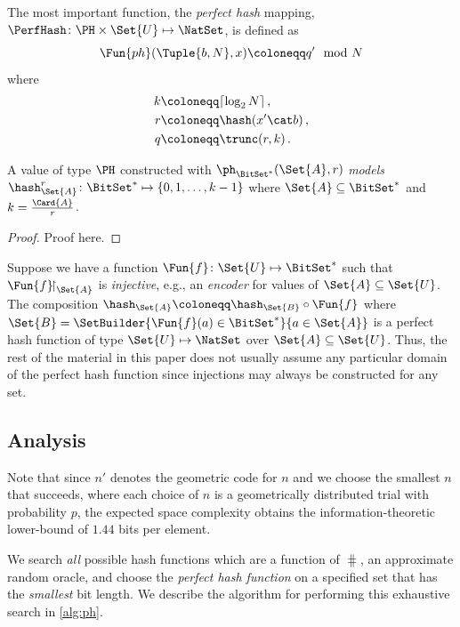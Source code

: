 \documentclass[ ../main.tex]{subfiles}
\begin{document}
The most important function, the \emph{perfect hash} mapping, $\PerfHash \colon \PH \times \Set{U} \mapsto \NatSet$, is defined as
\begin{equation}
	\Fun{ph}(\Tuple{b,N},x) \coloneqq q' \mod N
\end{equation}
where
\begin{equation}
\begin{split}
	k &\coloneqq \lceil \log_2 N \rceil\,,\\
	r &\coloneqq \hash(x' \cat b)\,,\\
	q &\coloneqq \trunc(r,k)\,.
\end{split}
\end{equation}



\begin{theorem}
A value of type $\PH$ constructed with $\ph_{\BitSet^*}(\Set{A},r)$ \emph{models} $\hash_{\Set{A}}^{r} \colon \BitSet^* \mapsto \{0,1,\ldots,k-1\}$ where $\Set{A} \subseteq \BitSet^*$ and $k = \frac{\Card{A}}{r}$.
\end{theorem}
\begin{proof}
Proof here.
\end{proof}

Suppose we have a function $\Fun{f} \colon \Set{U} \mapsto \BitSet^*$ such that $\Fun{f}\!\restriction_{\Set{A}}$ is \emph{injective}, e.g., an \emph{encoder} for values of $\Set{A} \subseteq \Set{U}$.
The composition $\hash_{\Set{A}} \coloneqq \hash_{\Set{B}} \circ \Fun{f}$ where $\Set{B} = \SetBuilder{\Fun{f}(a) \in \BitSet^*}{a \in \Set{A}}$ is a perfect hash function of type $\Set{U} \mapsto \NatSet$ over $\Set{A} \subseteq \Set{U}$.
Thus, the rest of the material in this paper does not usually assume any particular domain of the perfect hash function since injections may always be constructed for any set.

\subsection{Analysis}
Note that since $n'$ denotes the geometric code for $n$ and we choose the smallest $n$ that succeeds, where each choice of $n$ is a geometrically distributed trial with probability $p$, the expected space complexity obtains the information-theoretic lower-bound of $1.44$ bits per element.


We search \emph{all} possible hash functions which are a function of $\hash$, an approximate random oracle, and choose the \emph{perfect hash function} on a specified set that has the \emph{smallest} bit length. We describe the algorithm for performing this exhaustive search in \cref{alg:ph}.
\end{document}
